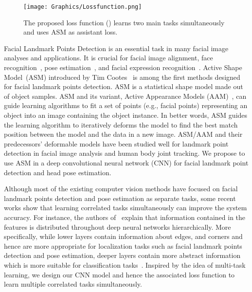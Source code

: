 \documentclass[final]{cvpr}
\begin{document}
\begin{figure}[t]
  \centering
  \texttt{[image: Graphics/Lossfunction.png]}
  \caption{The proposed loss function () learns two main tasks simultaneously and uses ASM as assistant loss.}
  \label{fig:loss_function}
\end{figure}

Facial Landmark Points Detection is an essential task in many facial image analyses and applications. It is crucial for facial image alignment, face recognition~\cite{huang2013coupling, lu2015surpassing, soltanpour2017survey}, pose estimation~\cite{vicente2015driver}, and facial expression recognition~\cite{sun2014deep, zhao2003face}. Active Shape Model~(ASM) introduced by Tim Cootes~\cite{cootes1995active} is among the first methods designed for facial landmark points detection. ASM is a statistical shape model made out of object samples. ASM and its variant, Active Appearance Models (AAM)~\cite{cootes1998active, martins2013generative}, can guide learning algorithms to fit a set of points (e.g., facial points) representing an object into an image containing the object instance. In better words, ASM guides the learning algorithm to iteratively deforms the model to find the best match position between the model and the data in a new image. ASM/AAM and their predecessors' deformable models \cite{lucey2011} have been studied well for landmark point detection in facial image analysis and human body joint tracking. We propose to use ASM in a deep convolutional neural network (CNN) for facial landmark point detection and head pose estimation. 

Although most of the existing computer vision methods have focused on facial landmark points detection and pose estimation as separate tasks, some recent works \cite{chen2014joint,ranjan2017hyperface, zhang2015hierarchical,zhao2003face} show that learning correlated tasks simultaneously can improve the system accuracy. For instance, the authors of~\cite{zeiler2014visualizing} explain that information contained in the features is distributed throughout deep neural networks hierarchically. More specifically, while lower layers contain information about edges, and corners and hence are more appropriate for localization tasks such as facial landmark points detection and pose estimation, deeper layers contain more abstract information which is more suitable for classification tasks~\cite{ranjan2017hyperface}. Inspired by the idea of multi-task learning, we design our CNN model and hence the associated loss function to learn multiple correlated tasks simultaneously.
\end{document}
